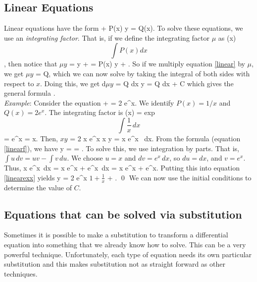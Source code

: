 \documentclass[12pt]{article}
\begin{document}
\subsection{Linear Equations}

Linear equations have the form
\be \label{linear}
   + P(x) y = Q(x).
\ee
To solve these equations, we use an \emph{integrating factor}. That is, if
we define the integrating factor $\mu$ as
\be 
  \mu(x) \doteq \exp\[ \int P(x) d x \],
\ee
then notice that
\be
  \(\mu y \) =  y + \mu {} 
  = \mu P(x) y + \mu {}.
\ee
So if we multiply equation \eqref{linear} by $\mu$, we get
\be 
  \(\mu y \) = \mu Q,
\ee
which we can now solve by taking the integral of both sides with respect to 
$x$. Doing this, we get
\be
  d\(\mu y\) = \mu Q dx \qquad \implies \qquad
  \mu y = \int \mu Q dx + C
\ee
which gives the general formula
\be
\label{linearf}
.
\ee
\\

\noindent \emph{Example}:
\label{linearsec}
Consider the equation
\be 
   +  = 2 e^x.
\ee
We identify $P(x)=1/x$ and $Q(x)=2e^x$. The integrating factor is
\be 
  \mu(x) = \mbox{exp}\[\int \frac{1}{x} \, dx \] = e^{\ln x} = x.
\ee
Then,
\be \label{linearex}
   \(x y \) = 2 x e^x
  \quad \implies \quad
  x y =  x e^x \, dx. 
\ee
From the formula (equation \eqref{linearf}), we have
\be
\label{linearexx}
y =  = .
\ee
To solve this, we use integration by parts. That is, 
$\int u \, dv = uv - \int v\,  du$. We choose $u=x$ and $dv = e^x \, dx$, so
$du = dx$, and $v=e^x$. Thus,
\be 
  \int x e^x \,dx = x e^x + \int e^x \,dx = x e^x + e^x.
\ee
Putting this into equation \eqref{linearexx} yields
\be 
  y = 2 e^x \(1 + \frac{1}{x}\) + . \qed
\ee
We can now use the initial conditions to determine the value of $C$.





\subsection{Equations that can be solved via substitution}

Sometimes it is possible to make a substitution to transform a differential 
equation into something that we already know how to solve. This can be a very 
powerful technique. Unfortunately, each type of equation needs its own 
particular substitution and this makes substitution not as straight forward as 
other techniques.
\end{document}
